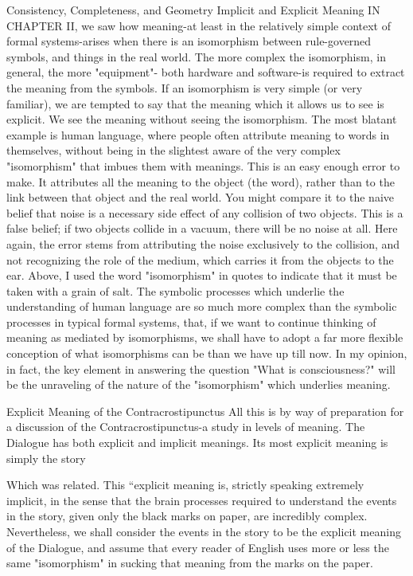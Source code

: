 Consistency, Completeness, and Geometry Implicit and Explicit Meaning IN CHAPTER II, we saw how meaning-at least in the relatively simple context of formal systems-arises when there is an isomorphism between rule-governed symbols, and things in the real world. The more complex the isomorphism, in general, the more "equipment"- both hardware and software-is required to extract the meaning from the symbols. If an isomorphism is very simple (or very familiar), we are tempted to say that the meaning which it allows us to see is explicit. We see the meaning without seeing the isomorphism. The most blatant example is human language, where people often attribute meaning to words in themselves, without being in the slightest aware of the very complex "isomorphism" that imbues them with meanings. This is an easy enough error to make. It attributes all the meaning to the object (the word), rather than to the link between that object and the real world. You might compare it to the naive belief that noise is a necessary side effect of any collision of two objects. This is a false belief; if two objects collide in a vacuum, there will be no noise at all. Here again, the error stems from attributing the noise exclusively to the collision, and not recognizing the role of the medium, which carries it from the objects to the ear. Above, I used the word "isomorphism" in quotes to indicate that it must be taken with a grain of salt. The symbolic processes which underlie the understanding of human language are so much more complex than the symbolic processes in typical formal systems, that, if we want to continue thinking of meaning as mediated by isomorphisms, we shall have to adopt a far more flexible conception of what isomorphisms can be than we have up till now. In my opinion, in fact, the key element in answering the question "What is consciousness?" will be the unraveling of the nature of the "isomorphism" which underlies meaning. 

Explicit Meaning of the Contracrostipunctus All this is by way of preparation for a discussion of the Contracrostipunctus-a study in levels of meaning. The Dialogue has both explicit and implicit meanings. Its most explicit meaning is simply the story 







Which was related. This “explicit meaning is, strictly speaking extremely implicit, in the sense that the brain processes required to understand the events in the story, given only the black marks on paper, are incredibly complex. Nevertheless, we shall consider the events in the story to be the explicit meaning of the Dialogue, and assume that every reader of English uses more or less the same "isomorphism" in sucking that meaning from the marks on the paper. 

